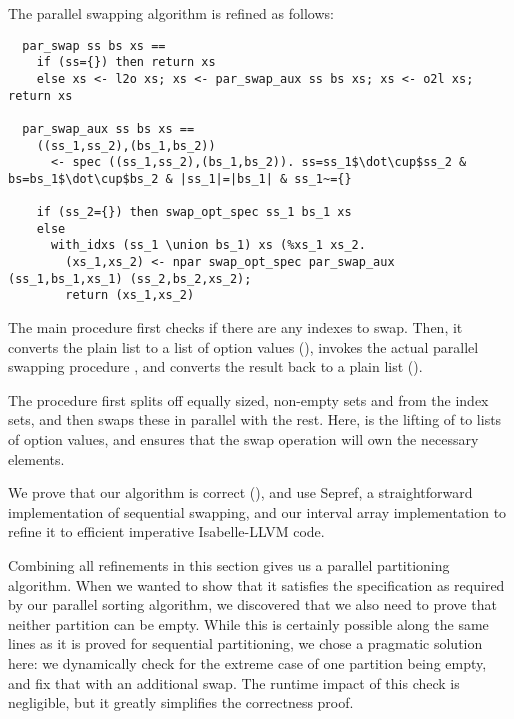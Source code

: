 \documentclass[sn-mathphys,Numbered]{sn-jnl}
\theoremstyle{thmstyleone}%
\theoremstyle{definition}%
\theoremstyle{thmstylethree}%
\begin{document}
  The parallel swapping algorithm is refined as follows:
  \begin{lstlisting}
  par_swap ss bs xs ==
    if (ss={}) then return xs
    else xs <- l2o xs; xs <- par_swap_aux ss bs xs; xs <- o2l xs; return xs

  par_swap_aux ss bs xs ==
    ((ss_1,ss_2),(bs_1,bs_2))
      <- spec ((ss_1,ss_2),(bs_1,bs_2)). ss=ss_1$\dot\cup$ss_2 & bs=bs_1$\dot\cup$bs_2 & |ss_1|=|bs_1| & ss_1~={}

    if (ss_2={}) then swap_opt_spec ss_1 bs_1 xs
    else
      with_idxs (ss_1 \union bs_1) xs (%xs_1 xs_2.
        (xs_1,xs_2) <- npar swap_opt_spec par_swap_aux (ss_1,bs_1,xs_1) (ss_2,bs_2,xs_2);
        return (xs_1,xs_2)
  \end{lstlisting}
  The main procedure  first checks if there are any indexes to swap.
  Then, it converts the plain list to a list of option values (), invokes the actual parallel swapping procedure ,
  and converts the result back to a plain list ().

  The  procedure first splits off equally sized, non-empty sets  and  from the index sets,
  and then swaps these in parallel with the rest. Here,  is the lifting of  to lists of option values,
  and  ensures that the swap operation will own the necessary elements.

  We prove that our algorithm is correct (),
  and use Sepref, a straightforward implementation of sequential swapping, and our interval array implementation
  to refine it to efficient imperative Isabelle-LLVM code.

  Combining all refinements in this section gives us a parallel partitioning algorithm. When we wanted to show that it
  satisfies the specification  as required by our parallel sorting algorithm, we discovered that we
  also need to prove that neither partition can be empty. While this is certainly possible along the same lines as it is proved for sequential partitioning, we chose a pragmatic solution here: we dynamically check for the extreme case of
  one partition being empty, and fix that with an additional swap. The runtime impact of this check is negligible, but it greatly simplifies the correctness proof.
\end{document}
